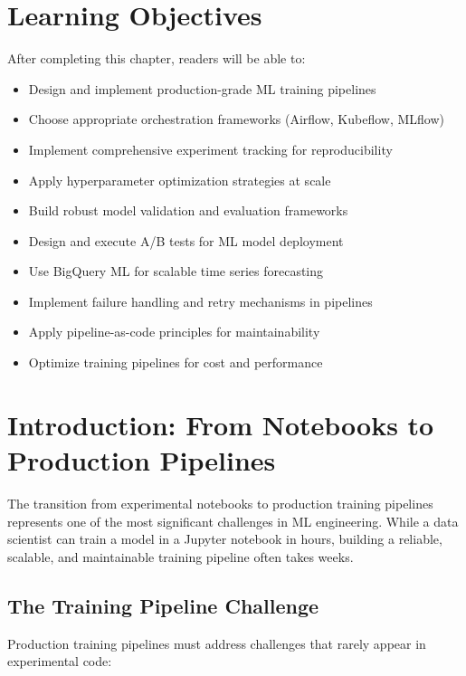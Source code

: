 \section{Learning Objectives}

After completing this chapter, readers will be able to:
\begin{itemize}
    \item Design and implement production-grade ML training pipelines
    \item Choose appropriate orchestration frameworks (Airflow, Kubeflow, MLflow)
    \item Implement comprehensive experiment tracking for reproducibility
    \item Apply hyperparameter optimization strategies at scale
    \item Build robust model validation and evaluation frameworks
    \item Design and execute A/B tests for ML model deployment
    \item Use BigQuery ML for scalable time series forecasting
    \item Implement failure handling and retry mechanisms in pipelines
    \item Apply pipeline-as-code principles for maintainability
    \item Optimize training pipelines for cost and performance
\end{itemize}

\section{Introduction: From Notebooks to Production Pipelines}

The transition from experimental notebooks to production training pipelines represents one of the most significant challenges in ML engineering. While a data scientist can train a model in a Jupyter notebook in hours, building a reliable, scalable, and maintainable training pipeline often takes weeks.

\subsection{The Training Pipeline Challenge}

Production training pipelines must address challenges that rarely appear in experimental code:

